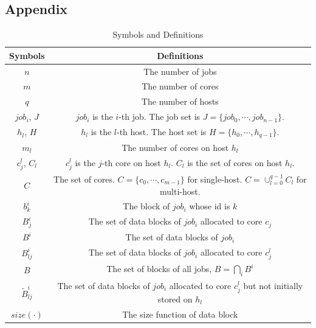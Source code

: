 \documentclass{llncs}
\begin{document}

%
%
%
%
% 
%



\newpage
\begin{appendices}
\section*{Appendix}

\begin{table}[htbp]
\caption{Symbols and Definitions}
\begin{center}
\begin{tabular}{c|c}
\toprule
\textbf{Symbols} &\textbf{Definitions}  \\
\midrule
$n$ & The number of jobs  \\
$m$ & The number of cores \\
$q$ & The number of hosts  \\
$job_i$, $J$ & $job_i$ is the $i$-th job. The job set is $J=\{job_0, \cdots, job_{n-1}\}$. \\
$h_l$, $H$ & $h_l$ is the $l$-th  host. The host set is $H=\{h_0, \cdots, h_{q-1}\}$. \\
$m_l$ & The number of cores on host $h_l$\\
$c^l_j$, $C_l$ & $c^l_j$ is the $j$-th core on host $h_l$. $C_l$ is the set of cores on host $h_l$.\\
$C$ & The set of cores. $C=\{c_0,\cdots,c_{m-1}\}$ for single-host. $C=\cup_{l=0}^{q-1} C_l$ for multi-host.\\
$b^i_k$& The block of $job_i$ whose id is $k$\\
$B^i_{j}$ & The set of data blocks of $job_i$ allocated to core $c_j$ \\
$B^i$ & The set of data blocks of $job_i$ \\
$B^i_{lj}$ & The set of data blocks of $job_i$ allocated to core $c^l_j$ \\
$B$ & The set of blocks of all jobs, $B = \bigcap_{i} B^{i}$ \\
$\widetilde{B}^i_{lj}$ & The set of data blocks of $job_i$ allocated to core $c^l_j$ but not initially stored on $h_l$\\
$size(\cdot)$ & The size function of data block\\

\end{tabular}
\end{center}
\end{table}
\end{appendices}
\end{document}
